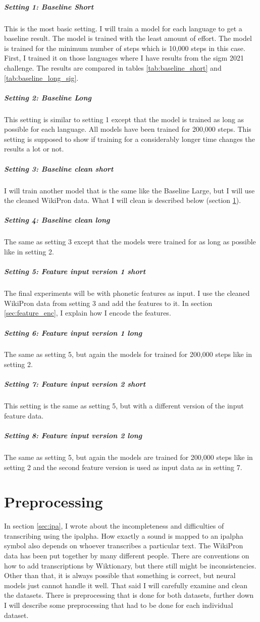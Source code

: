 \subparagraph{Setting 1: Baseline Short}
This is the most basic setting. I will train a model for each language to get a baseline result. The model is trained with the least amount of effort. The model is trained for the minimum number of steps which is 10,000 steps in this case. First, I trained it on those languages where I have results from the \ac{sigm} 2021 challenge. The results are compared in tables \ref{tab:baseline_short} and \ref{tab:baseline_long_sig}.

\subparagraph{Setting 2: Baseline Long}
This setting is similar to setting 1 except that the model is trained as long as possible for each language. All models have been trained for 200,000 steps. This setting is supposed to show if training for a considerably longer time changes the results a lot or not.

\subparagraph{Setting 3: Baseline clean short}
I will train another model that is the same like the Baseline Large, but I will use the cleaned WikiPron data. What I will clean is described below (section \ref{preprocess}).

\subparagraph{Setting 4: Baseline clean long}
The same as setting 3 except that the models were trained for as long as possible like in setting 2.

\subparagraph{Setting 5: Feature input version 1 short}
The final experiments will be with phonetic features as input. I use the cleaned WikiPron data from setting 3 and add the features to it. In section \ref{sec:feature_enc}, I explain how I encode the features. 

\subparagraph{Setting 6: Feature input version 1 long}
The same as setting 5, but again the models for trained for 200,000 steps like in setting 2.

\subparagraph{Setting 7: Feature input version 2 short}
This setting is the same as setting 5, but with a different version of the input feature data.

\subparagraph{Setting 8: Feature input version 2 long}
The same as setting 5, but again the models are trained for 200,000 steps like in setting 2 and the second feature version is used as input data as in setting 7.

\section{Preprocessing}
\label{preprocess}
In section \ref{sec:ipa}, I wrote about the incompleteness and difficulties of transcribing using the \ac{ipalpha}. How exactly a sound is mapped to an \ac{ipalpha} symbol also depends on whoever transcribes a particular text. The WikiPron data has been put together by many different people. There are conventions on how to add transcriptions by Wiktionary, but there still might be inconsistencies. Other than that, it is always possible that something is correct, but neural models just cannot handle it well. That said I will carefully examine and clean the datasets. There is preprocessing that is done for both datasets, further down I will describe some preprocessing that had to be done for each individual dataset.

